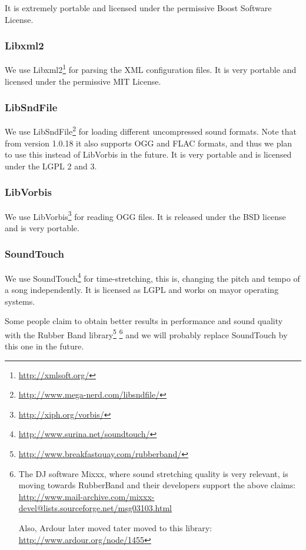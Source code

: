 It is extremely portable and licensed under the permissive Boost
Software License.

\subsubsection{Libxml2}

We use Libxml2\footnote{\url{http://xmlsoft.org/}} for parsing the XML
configuration files. It is very portable and licensed under the
permissive MIT License.

\subsubsection{LibSndFile}

We use LibSndFile\footnote{\url{http://www.mega-nerd.com/libsndfile/}} for
loading different uncompressed sound formats. Note that from version
1.0.18 it also supports OGG and FLAC formats, and thus we plan to use
this instead of LibVorbis in the future. It is very portable and is
licensed under the LGPL 2 and 3.

\subsubsection{LibVorbis}

We use LibVorbis\footnote{\url{http://xiph.org/vorbis/}} for reading
OGG files. It is released under the BSD license and is very portable.

\subsubsection{SoundTouch}

We use SoundTouch\footnote{\url{http://www.surina.net/soundtouch/}}
for time-stretching, this is, changing the pitch and tempo of a song
independently. It is licensed as LGPL and works on mayor operating
systems.

Some people claim to obtain better results in performance and sound
quality with the Rubber Band
library\footnote{\url{http://www.breakfastquay.com/rubberband/}}
\footnote{The DJ software Mixxx, where sound stretching quality is
  very relevant, is moving towards RubberBand and their developers
  support the above claims:
  \url{http://www.mail-archive.com/mixxx-devel@lists.sourceforge.net/msg03103.html}

  Also, Ardour later moved tater moved to this library:
  \url{http://www.ardour.org/node/1455}} and we will probably replace
SoundTouch by this one in the future.


